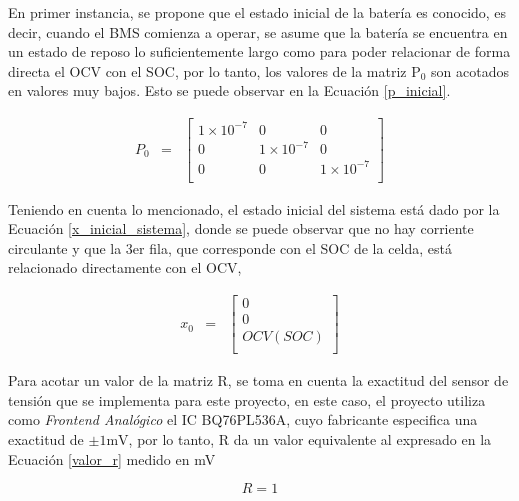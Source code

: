\documentclass[10pt, a4paper]{article}
\begin{document}
En primer instancia, se propone que el estado inicial de la bater\'ia es
conocido, es decir, cuando el \acrshort{BMS} comienza a operar, se asume que la
bater\'ia se encuentra en un estado de reposo lo suficientemente largo como para
poder relacionar de forma directa el \acrshort{OCV} con el \acrshort{SOC}, por
lo tanto, los valores de la matriz $\mathrm{P_0}$ son acotados en valores muy
bajos. Esto se puede observar en la Ecuaci\'on \ref{p_inicial}.


\begin{equation}
    \begin{array}{llll}
	P_0 & = & \begin{bmatrix}
        1\times10^{-7}  & 0              & 0 \\
        0               & 1\times10^{-7} & 0 \\
        0               & 0              & 1\times10^{-7} \\
	\end{bmatrix} 
    \end{array}
    \label{p_inicial}
\end{equation}

Teniendo en cuenta lo mencionado, el estado inicial del sistema est\'a dado por
la Ecuaci\'on \ref{x_inicial_sistema}, donde se puede observar que no hay
corriente circulante y que la 3er fila, que corresponde con el \acrshort{SOC} de
la celda, est\'a relacionado directamente con el \acrshort{OCV},

\begin{equation}
    \begin{array}{llll}
	x_0 & = & \begin{bmatrix}
	    0 \\
	    0 \\
        OCV(SOC) \\
	\end{bmatrix} 
    \end{array} \label{x_inicial_sistema}
\end{equation}

Para acotar un valor de la matriz R, se toma en cuenta la exactitud del sensor
de tensi\'on que se implementa para este proyecto, en este caso, el proyecto
utiliza como \emph{Frontend Anal\'ogico} el \acrshort{IC} BQ76PL536A, cuyo
fabricante especifica una exactitud de $\mathrm{\pm 1mV}$, por lo tanto, R da un 
valor equivalente al expresado en la Ecuaci\'on \ref{valor_r} medido en mV

\begin{equation}
    R = 1  \label{valor_r}
\end{equation}
\end{document}
